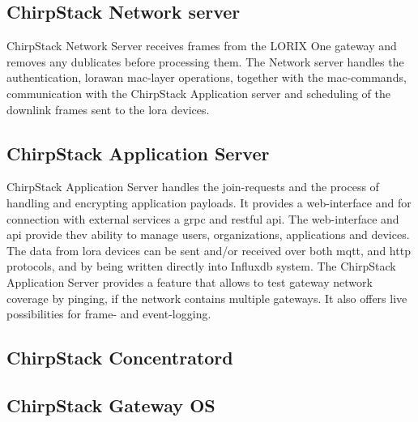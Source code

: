 \cite{chirpstack:gateway_bridge}

\subsection{ChirpStack Network server}
ChirpStack Network Server receives frames from the LORIX One gateway and removes any dublicates before processing them.
The Network server handles the authentication, \gls{lorawan} \gls{mac}-layer operations, together with the \gls{mac}-commands, communication with the ChirpStack Application server and scheduling of the downlink frames sent to the \gls{lora} devices.

\cite{chirpstack:network_server}

\subsection{ChirpStack Application Server}

ChirpStack Application Server handles the join-requests and the process of handling and encrypting application payloads.
It provides a web-interface and for connection with external services a \gls{grpc} and \gls{rest}ful \gls{api}.
The web-interface and \gls{api} provide thev ability to manage users, organizations, applications and devices.
The data from \gls{lora} devices can be sent and/or received over both \gls{mqtt}, and \gls{http} protocols, and by being  written directly into Influx\gls{db} system.
The ChirpStack Application Server provides a feature that allows to test gateway network coverage by pinging, if the network contains multiple gateways.
It also offers live possibilities for frame- and event-logging.

\cite{chirpstack:application_server}

\subsection{ChirpStack Concentratord}

\subsection{ChirpStack Gateway OS}


